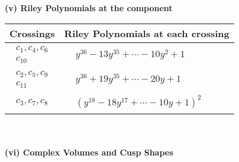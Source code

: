 \documentclass[1p]{elsarticle_modified}
\theoremstyle{definition}
\begin{document}
\newpage\renewcommand{\arraystretch}{1}
\flushleft \textbf{(v) Riley Polynomials at the component}\newline \\
\begin{tabular}{m{50pt}|m{274pt}}
Crossings & \hspace{64pt}Riley Polynomials at each crossing \\
\hline $$\begin{aligned}c_{1},c_{4},c_{6}\\c_{10}\end{aligned}$$&$\begin{aligned}
&y^{36}-13 y^{35}+\cdots-10 y^2+1
\end{aligned}$\\
\hline $$\begin{aligned}c_{2},c_{5},c_{9}\\c_{11}\end{aligned}$$&$\begin{aligned}
&y^{36}+19 y^{35}+\cdots-20 y+1
\end{aligned}$\\
\hline $$\begin{aligned}c_{3},c_{7},c_{8}\end{aligned}$$&$\begin{aligned}
&(y^{18}-18 y^{17}+\cdots-10 y+1)^{2}
\end{aligned}$\\
\hline
\end{tabular}\\~\\
\newpage\flushleft \textbf{(vi) Complex Volumes and Cusp Shapes}
\end{document}
